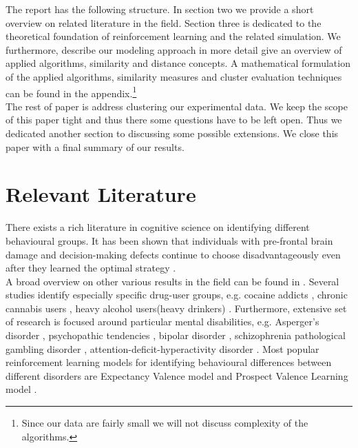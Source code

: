 \documentclass[12pt,a4paper,bibliography=totocnumbered,listof=totocnumbered]{scrartcl}
\begin{document}
The report has the following structure. In section two we provide a short overview on related literature in the field. Section three is dedicated to the theoretical foundation of reinforcement learning and the related simulation. We furthermore, describe our modeling approach in more detail give an overview of applied algorithms, similarity and distance concepts. A mathematical formulation of the applied algorithms, similarity measures and cluster evaluation techniques can be found in the appendix.\footnote{Since our data are fairly small we will not discuss complexity of the algorithms.}\\
The rest of paper is address clustering our experimental data. We keep the scope of this paper tight and thus there some questions have to be left open. Thus we dedicated another section to discussing some possible extensions. We close this paper with a final summary of our results.


\section{Relevant Literature}

There exists a rich literature in cognitive science on identifying different behavioural groups. It has been shown that individuals with pre-frontal brain damage and decision-making defects continue to choose disadvantageously even after they learned the optimal strategy \cite{Bechara1997}.\\
A broad overview on other various results in the field can be found in \cite{Steingroever2013}. Several studies identify especially specific drug-user groups, e.g. cocaine addicts \cite{Stout2004}, chronic cannabis users \cite{Fridberg2010}, heavy alcohol users(heavy drinkers) \cite{Gullo2011}. Furthermore, extensive set of research is focused around particular mental disabilities, e.g. Asperger's disorder \cite{Johnson2006}, psychopathic tendencies \cite{Blair2001}, bipolar disorder \cite{Brambilla2012}, schizophrenia \cite{Martino2007} pathological gambling disorder \cite{Cavedini2002}, attention-deficit-hyperactivity disorder \cite{NiritAgay2010}. Most popular reinforcement learning models for identifying behavioural differences between different disorders are Expectancy Valence model \cite{Busemeyer2002} and Prospect Valence Learning model \cite{Ahn2008}.
\end{document}
